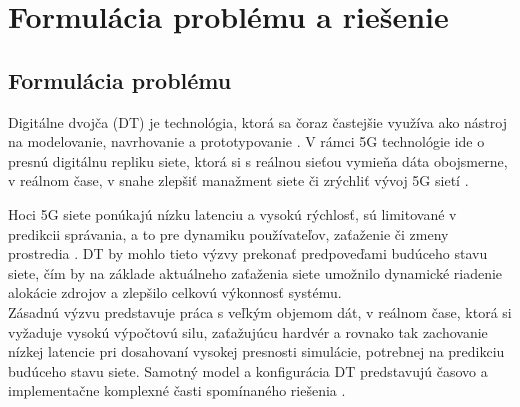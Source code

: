 \chapter{Formulácia problému a riešenie}

\section{Formulácia problému}
\par{
Digitálne dvojča (DT) je technológia, ktorá sa čoraz častejšie využíva ako nástroj na modelovanie, navrhovanie a prototypovanie \cite{dt-iot}. V rámci 5G technológie ide o presnú digitálnu repliku siete, ktorá si s reálnou sieťou vymieňa dáta obojsmerne, v reálnom čase, v snahe zlepšiť manažment siete či zrýchliť vývoj 5G sietí \cite{systematicReview}.
}
\par{
Hoci 5G siete ponúkajú nízku latenciu a vysokú rýchlosť, sú limitované v predikcii správania, a to pre dynamiku používateľov, zaťaženie či zmeny prostredia \cite{dt-network}. DT by mohlo tieto výzvy prekonať predpoveďami budúceho stavu siete, čím by na základe aktuálneho zaťaženia siete umožnilo dynamické riadenie alokácie zdrojov a zlepšilo celkovú výkonnosť systému\cite{5g-challenges}.
\\ 
Zásadnú výzvu predstavuje práca s veľkým objemom dát, v reálnom čase, ktorá si vyžaduje vysokú výpočtovú silu, zaťažujúcu hardvér \cite{challenges-technol} a rovnako tak zachovanie nízkej latencie pri dosahovaní vysokej presnosti simulácie, potrebnej na predikciu budúceho stavu siete. Samotný model a konfigurácia DT predstavujú časovo a implementačne komplexné časti spomínaného riešenia \cite{challengesAndApplicationsReview}.
}

